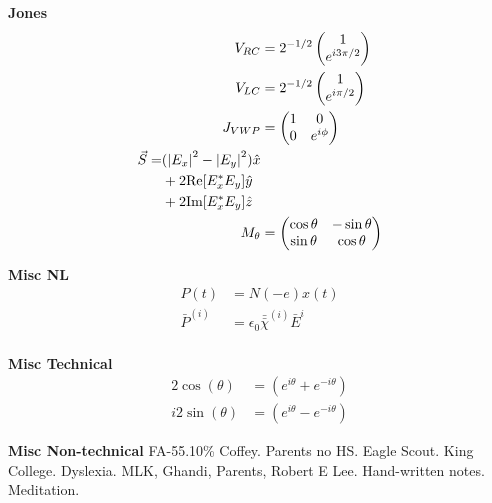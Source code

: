 \documentclass[12pt]{article}
\begin{document}
\begin{multicols}{3}
\textbf{Jones}
\begin{align}
  V_{RC} &= 2^{-1/2} \begin{pmatrix}1\\e^{i3\pi/2}\end{pmatrix}\\
  V_{LC} &= 2^{-1/2} \begin{pmatrix}1\\e^{i\pi/2}\end{pmatrix}\\
  J_{VWP} &= \begin{pmatrix} 1 & 0\\0 & e^{i \phi}\end{pmatrix}\\
  \begin{split}
    \vec{S} {}= &(\abs{E_x}^2 - \abs{E_y}^2) \hat{x}\\
    &+ 2\textrm{Re}[E_x^{*}E_y] \hat{y}\\
    &+ 2\textrm{Im}[E_x^{*}E_y] \hat{z}
  \end{split}\\
  M_{\theta} &= \begin{pmatrix}
    \cos\theta & -\sin\theta\\
    \sin\theta & \cos\theta
  \end{pmatrix}\\
\end{align}

\textbf{Misc NL}
\begin{align}
  P(t) &= N (-e) x(t)\\
  \bar{P}^{(i)} &= \epsilon_0 \bar{\bar{\chi}}^{(i)} \bar{E}^{i}\\
\end{align}

\textbf{Misc Technical}
\begin{align}
  2\cos(\theta) &= (e^{i\theta} + e^{-i\theta})\\
  i2\sin(\theta) &= (e^{i\theta} - e^{-i\theta})
\end{align}

\textbf{Misc Non-technical}
FA-55.10\% Coffey. Parents no HS. Eagle Scout. King College. Dyslexia.
MLK, Ghandi, Parents, Robert E Lee. Hand-written notes. Meditation.


\end{multicols}
\end{document}
